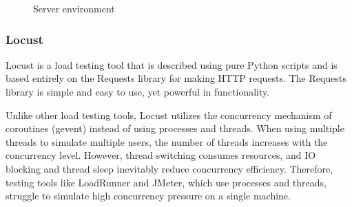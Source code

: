 \documentclass[journal]{IEEEtran}
\begin{document}
\begin{figure}[h]
  \centering
{}
  \hfill
{}
\caption{Server environment}
\label{fig:evalusrv} 
\end{figure}


\subsubsection{Locust}
Locust is a load testing tool that is described using pure Python scripts and is based entirely on the Requests library for making HTTP requests. The Requests library is simple and easy to use, yet powerful in functionality.

Unlike other load testing tools, Locust utilizes the concurrency mechanism of coroutines (gevent) instead of using processes and threads. When using multiple threads to simulate multiple users, the number of threads increases with the concurrency level. However, thread switching consumes resources, and IO blocking and thread sleep inevitably reduce concurrency efficiency. Therefore, testing tools like LoadRunner and JMeter, which use processes and threads, struggle to simulate high concurrency pressure on a single machine.
\end{document}
